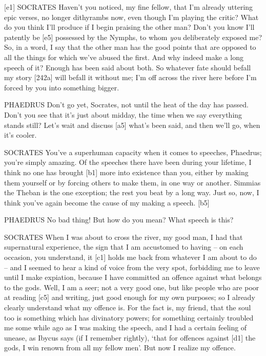 {[}e1{]} SOCRATES Haven't you noticed, my fine fellow, that I'm already
uttering epic verses, no longer dithyrambs now, even though I'm playing
the critic? What do you
think I'll produce if I begin praising the other man? Don't you know
I'll patently be {[}e5{]} possessed by the Nymphs, to whom {\em you}
deliberately exposed me? So, in a word, I say that the other man has the
good points that are opposed to all the things for which we've abused
the first. And why indeed make a long speech of it? Enough has been said
about both. So whatever fate should befall my story {[}242a{]} will
befall it without me; I'm
off across the river here before I'm forced by you into something
bigger.

PHAEDRUS Don't go yet, Socrates, not until the heat of the day has
passed. Don't you see that it's just about midday, the
time when we say
everything stands still? Let's wait and discuss {[}a5{]} what's been
said, and then we'll go, when it's cooler.

SOCRATES You've a superhuman
capacity when it comes to
speeches, Phaedrus; you're simply amazing. Of the speeches there have
been during your lifetime, I think no one has brought {[}b1{]} more into
existence than you, either by making them yourself or by forcing others
to make them, in one way or another. Simmias the
Theban is the one
exception; the rest you beat by a long way. Just so, now, I think you've
again become the cause of my making a speech. {[}b5{]}

PHAEDRUS No bad thing! But how do you mean? What speech is this?

SOCRATES When I was about to cross the river, my good man, I had that
supernatural experience, the
sign that I am accustomed
to having -- on each occasion, you understand, it {[}c1{]} holds me back
from whatever I am about to do -- and I seemed to hear a kind of voice
from the very spot, forbidding me to leave until I make expiation,
because I have committed an offence against what belongs to the
gods. Well, I am a seer;
not a very good one, but like people who are poor at reading {[}c5{]}
and writing, just good enough for my own purposes; so I already clearly
understand what my offence is. For the fact is, my friend, that the soul
too is something which has divinatory powers; for something certainly
troubled me some while ago as I was making the speech, and I had a
certain feeling of unease, as Ibycus says (if I remember rightly), ‘that
for offences against {[}d1{]} the gods, I win renown from all my fellow
men'. But now I realize
my offence.

